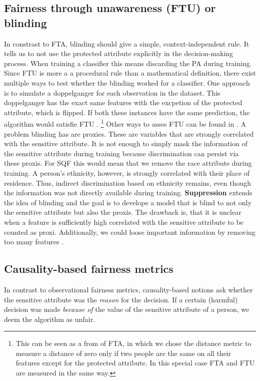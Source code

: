 \subsection*{Fairness through unawareness (FTU) or blinding}
In constrast to FTA, blinding should give a simple, context-independent rule. It tells us to not use the protected attribute explicitly in the decision-making process. When training a classifier this means discarding the PA during training.
Since FTU is more a a procedural rule than a mathematical definition, there exist multiple ways to test whether the blinding worked for a classifier. One approach is to simulate a doppelganger for each observation in the dataset. This doppelganger has the exact same features with the excpetion of the protected attribute, which is flipped.
If both these instances have the same prediction, the algorithm would satisfie FTU \cite{verma2018}. \footnote{This can be seen as a from of FTA, in which we chose the distance metric to measure a distance of zero only if two people are the same on all their features except for the protected attribute. In this special case FTA and FTU are measured in the same way.} Other ways to asses FTU can be found in \cite{verma2018}. 
A problem blinding has are proxies. These are variables that are strongly correlated with the sensitive attribute. It is not enough to simply mask the information of the sensitive attribute during training because discrimination can persist via these proxis.
For SQF this would mean that we remove the race attribute during training.
A person's ethnicity, however, is strongly correlated with their place of residence. Thus, indirect discrimination based on ethnicity remains, even though the information was not directly available during training. \textbf{Suppression} extends the idea of blinding and the goal is to develope a model that is blind to not only the sensitive attribute but also the proxis. The drawback is, that it is unclear when a feature is sufficiently high correlated with the sensitive attribute to be counted as proxi. Additionally, we could loose important information by removing too many features \cite{castelnovo2022}.

\subsection{Causality-based fairness metrics}
In contrast to observational fairness metrics, causality-based notions ask whether the sensitive attribute was the \textit{reason} for the decision. If a certain (harmful) decision was made \textit{because of} the value of the sensitive attribute of a person, we deem the algorithm as unfair.

